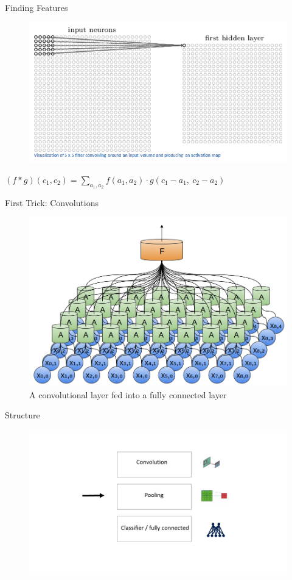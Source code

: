 \documentclass[12pt]{beamer}
\begin{document}
\begin{frame}{Finding Features}
\begin{figure}
\includegraphics[width = 0.6\linewidth]{images/activation.png}
\label{fig:principle}
\end{figure}
$(f\ast g)(c_1, c_2) = \sum_{a_1, a_2} f(a_1, a_2) \cdot g(c_1-a_1,~ c_2-a_2)$

\end{frame}

\begin{frame}{First Trick: Convolutions}
\begin{figure}
\includegraphics[width = 0.8\linewidth]{images/convnet.png}
\caption{A convolutional layer fed into a fully connected layer}
\label{fig:principle}
\end{figure}
\end{frame}

\begin{frame}{Structure}
\begin{figure}
\includegraphics[width = 1\linewidth]{images/struct2.jpg}
\label{fig:principle}
\end{figure}
\end{frame}
\end{document}
